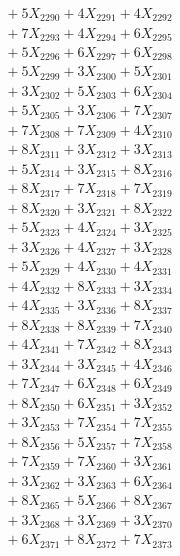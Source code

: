 \documentclass[a4paper,10pt]{article}
\begin{document}
{\begin{align}
&\;  + 5 X_{2290} + 4 X_{2291} + 4 X_{2292} \\[0.3ex]
&\;  + 7 X_{2293} + 4 X_{2294} + 6 X_{2295} \\[0.3ex]
&\;  + 5 X_{2296} + 6 X_{2297} + 6 X_{2298} \\[0.3ex]
&\;  + 5 X_{2299} + 3 X_{2300} + 5 X_{2301} \\[0.3ex]
&\;  + 3 X_{2302} + 5 X_{2303} + 6 X_{2304} \\[0.3ex]
&\;  + 5 X_{2305} + 3 X_{2306} + 7 X_{2307} \\[0.3ex]
&\;  + 7 X_{2308} + 7 X_{2309} + 4 X_{2310} \\[0.3ex]
&\;  + 8 X_{2311} + 3 X_{2312} + 3 X_{2313} \\[0.3ex]
&\;  + 5 X_{2314} + 3 X_{2315} + 8 X_{2316} \\[0.3ex]
&\;  + 8 X_{2317} + 7 X_{2318} + 7 X_{2319} \\[0.5ex]\allowbreak
&\;  + 8 X_{2320} + 3 X_{2321} + 8 X_{2322} \\[0.3ex]
&\;  + 5 X_{2323} + 4 X_{2324} + 3 X_{2325} \\[0.3ex]
&\;  + 3 X_{2326} + 4 X_{2327} + 3 X_{2328} \\[0.3ex]
&\;  + 5 X_{2329} + 4 X_{2330} + 4 X_{2331} \\[0.3ex]
&\;  + 4 X_{2332} + 8 X_{2333} + 3 X_{2334} \\[0.3ex]
&\;  + 4 X_{2335} + 3 X_{2336} + 8 X_{2337} \\[0.3ex]
&\;  + 8 X_{2338} + 8 X_{2339} + 7 X_{2340} \\[0.3ex]
&\;  + 4 X_{2341} + 7 X_{2342} + 8 X_{2343} \\[0.3ex]
&\;  + 3 X_{2344} + 3 X_{2345} + 4 X_{2346} \\[0.3ex]
&\;  + 7 X_{2347} + 6 X_{2348} + 6 X_{2349} \\[0.5ex]\allowbreak
&\;  + 8 X_{2350} + 6 X_{2351} + 3 X_{2352} \\[0.3ex]
&\;  + 3 X_{2353} + 7 X_{2354} + 7 X_{2355} \\[0.3ex]
&\;  + 8 X_{2356} + 5 X_{2357} + 7 X_{2358} \\[0.3ex]
&\;  + 7 X_{2359} + 7 X_{2360} + 3 X_{2361} \\[0.3ex]
&\;  + 3 X_{2362} + 3 X_{2363} + 6 X_{2364} \\[0.3ex]
&\;  + 8 X_{2365} + 5 X_{2366} + 8 X_{2367} \\[0.3ex]
&\;  + 3 X_{2368} + 3 X_{2369} + 3 X_{2370} \\[0.3ex]
&\;  + 6 X_{2371} + 8 X_{2372} + 7 X_{2373} \\[0.3ex]

\end{align}}
\end{document}

